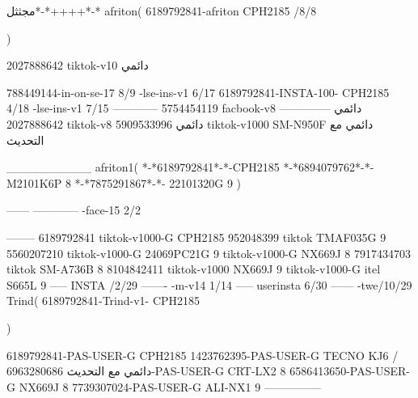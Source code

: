 مجثثل*-*++++*-*
afriton(
6189792841-afriton CPH2185  /8/8

)

2027888642 tiktok-v10
دائمي

788449144-in-on-se-17 8/9
-lse-ins-v1 6/17
6189792841-INSTA-100- CPH2185 4/18
-lse-ins-v1 7/15
------------
5754454119 facbook-v8
دائمي
--------------
2027888642 tiktok-v8
دائمي
5909533996 tiktok-v1000  SM-N950F
دائمي مع التحديث

__________
afriton1(
*-*6189792841*-*-CPH2185
*-*6894079762*-*- M2101K6P   8
*-*7875291867*-*- 22101320G   9\2
)


------
------------
-face-15 2/2

--------
6189792841 tiktok-v1000-G CPH2185 
952048399 tiktok TMAF035G 9
5560207210 tiktok-v1000-G 24069PC21G  9 tiktok-v1000-G NX669J  8
7917434703 tiktok  SM-A736B   8
8104842411 tiktok-v1000 NX669J  9 tiktok-v1000-G  itel S665L  9\3
-----
 INSTA /2/29
-------
-m-v14 1/14
-----
userinsta 6/30
------
-twe/10/29
Trind(
6189792841-Trind-v1- CPH2185 

)


6189792841-PAS-USER-G CPH2185 
1423762395-PAS-USER-G TECNO KJ6  /دائمي مع التحديث
6963280686-PAS-USER-G  CRT-LX2  8
6586413650-PAS-USER-G  NX669J  8
7739307024-PAS-USER-G  ALI-NX1  9\4
    ---------------
